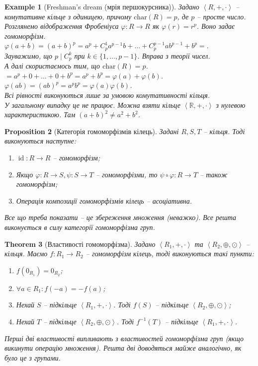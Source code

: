 \documentclass[a4paper, 10pt]{article}
\theoremstyle{theoremdd}
\newtheorem{theorem}{Theorem}[subsection]
\theoremstyle{theoremdd}
\theoremstyle{theoremdd}
\theoremstyle{theoremdd}
\theoremstyle{theoremdd}
\newtheorem{example}[theorem]{Example}
\theoremstyle{theoremdd}
\theoremstyle{theoremdd}
\theoremstyle{theoremdd}
\theoremstyle{theoremdd}
\newtheorem{proposition}[theorem]{Proposition}
\theoremstyle{theoremdd}
\theoremstyle{theoremdd}
\theoremstyle{theoremdd}
\theoremstyle{theoremdd}
\theoremstyle{theoremdd}
\theoremstyle{theoremdd}
\DeclareMathOperator{\id}{id}
\begin{document}
\begin{example}[Freshman's dream (мрія першокурсника)]
Задано $\left< R,+,\cdot\right>$ -- комутативне кільце з одиницею, причому $\text{char}(R) = p$, де $p$ -- просте число. Розглянемо відображення Фробеніуса $\varphi \colon R \to R$ як $\varphi(r) = r^p$. Воно задає гомоморфізм.\\
$\varphi(a+b) = (a+b)^p = a^p + C_p^1 a^{p-1}b + \dots + C_p^{p-1} ab^{p-1} + b^p \boxed{=}$.\\
Зауважимо, що $p \mid C_p^k$ при $k \in \{1,\dots,p-1\}$. Вправа з теорії чисел.\\
А далі скористаємось тим, що $\text{char}(R) = p$.\\
$\boxed{=} a^p + 0 + \dots + 0 + b^p = a^p + b^p = \varphi(a) + \varphi(b)$.\\
$\varphi(ab) = (ab)^p = a^p b^p = \varphi(a) \varphi(b)$.\\
Всі рівності виконуються лише за умовою комутативності кільця.
\bigskip \\
У загальному випадку це не працює. Можна взяти кільце $\left< \mathbb{R},+,\cdot \right>$ з нулевою характеристикою. Там $(a+b)^2 \neq a^2+b^2$.
\end{example}

\begin{proposition}[Категорія гомоморфізмів кілець]
Задані $R,S,T$ -- кільця. Тоді виконуються наступне:
\begin{enumerate}[nosep,wide=0pt,label={\arabic*)}]
\item $\id \colon R \to R$ -- гомоморфізм;
\item Якщо $\varphi \colon R \! \to S, \psi \colon S \! \to T$ -- гомоморфізми, то $\psi \circ \varphi \colon R \! \to T$ -- також гомоморфізм;
\item Операція композиції гомоморфізмів кілець -- асоціативна.
\end{enumerate}
\textit{Все що треба показати -- це збереження множення (неважко). Все решта виконується в силу категорії гомоморфізма груп.}
\end{proposition}

\begin{theorem}[Властивості гомоморфізма]
Задано $\left<R_1, +, \cdot \right>$ та $\left<R_2, \oplus, \odot \right>$ -- кільця. Маємо $f \colon R_1 \to R_2$ -- гомоморфізм кілець, тоді виконуються такі пункти:
\begin{enumerate}[nosep,wide=0pt,label={\arabic*)}]
\item $f(0_{R_1}) = 0_{R_2}$;
\item $\forall a \in R_1: f(-a) = -f(a)$;
\item Нехай $S$ -- підкільце $\left<R_1,+,\cdot \right>$. Тоді $f(S)$ -- підкільце $\left<R_2, \oplus, \odot \right>$;
\item Нехай $T$ -- підкільце $\left<R_2, \oplus, \odot \right>$. Тоді $f^{-1}(T)$ -- підкільце $\left<R_1,+,\cdot \right>$.
\end{enumerate}
\textit{Перші дві властивості випливають з властивостей гомоморфізма груп (якщо викинути операцію множення). Решта дві доводяться майже аналогічно, як було це з групами.}
\end{theorem}
\end{document}
